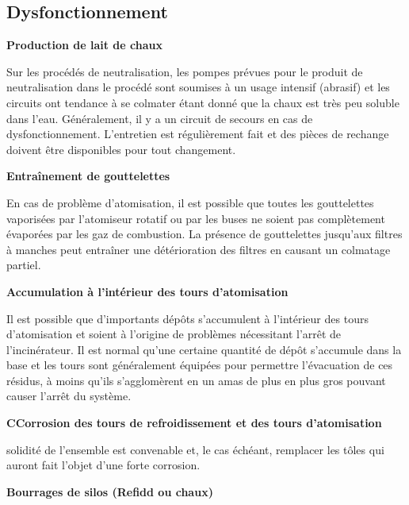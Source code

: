 \subsection{Dysfonctionnement}



\vspace{0.3cm}
\textbf{Production de lait de chaux}
\vspace{0.3cm}

Sur les procédés de neutralisation, les pompes prévues pour le produit de neutralisation dans le procédé sont soumises à un usage intensif (abrasif) et les circuits ont tendance à se colmater étant donné que la chaux est très peu soluble dans l’eau. Généralement, il y a un circuit de secours en cas de dysfonctionnement. L’entretien est régulièrement fait et des pièces de rechange doivent être disponibles pour tout changement.


\vspace{0.3cm}
\textbf{Entraînement de gouttelettes}
\vspace{0.3cm}

En cas de problème d’atomisation, il est possible que toutes les gouttelettes vaporisées par l’atomiseur rotatif ou par les buses ne soient pas complètement évaporées par les gaz de combustion. La présence de gouttelettes jusqu’aux filtres à manches peut entraîner une détérioration des filtres en causant un colmatage partiel.

\vspace{0.3cm}
\textbf{Accumulation à l’intérieur des tours d’atomisation}
\vspace{0.3cm}

Il est possible que d’importants dépôts s’accumulent à l’intérieur des tours d’atomisation et soient à l’origine de problèmes nécessitant l’arrêt de l’incinérateur. Il est normal qu’une certaine quantité de dépôt s’accumule dans la base et les tours sont généralement équipées pour permettre l’évacuation de ces résidus, à moins qu’ils s’agglomèrent en un amas de plus en plus gros pouvant causer l’arrêt du système.

\vspace{0.3cm}
\textbf{CCorrosion des tours de refroidissement et des tours d’atomisation}
\vspace{0.3cm}

solidité de l’ensemble est convenable et, le cas échéant, remplacer les tôles qui auront fait l’objet d’une forte corrosion.


\vspace{0.3cm}
\textbf{Bourrages de silos (Refidd ou chaux)}
\vspace{0.3cm}

